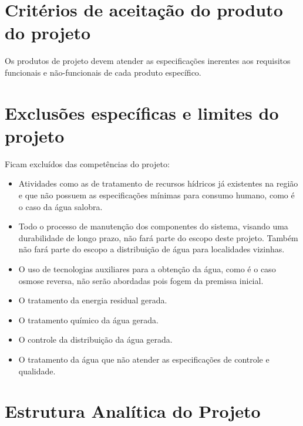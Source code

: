 \section*{Critérios de aceitação do produto do projeto}

  Os produtos de projeto devem atender as especificações inerentes aos requisitos funcionais
  e não-funcionais de cada produto específico.
  
\section*{Exclusões específicas e limites do projeto}

  Ficam excluídos das competências do projeto:
  
  \begin{itemize}
   \item Atividades como as de tratamento de recursos hídricos já existentes na região e que não possuem
      as especificações mínimas para consumo humano, como é o caso da água salobra.
   
   \item Todo o processo de manutenção dos componentes do sistema, visando uma durabilidade de longo prazo, não fará parte 
      do escopo deste projeto. Também não fará parte do escopo a distribuição de água para localidades vizinhas.
      
   \item O uso de tecnologias auxiliares para a obtenção da água, como é o caso osmose reversa, não serão abordadas
      pois fogem da premissa inicial.
   
   \item O tratamento da energia residual gerada.
   
   \item O tratamento químico da água gerada.
   
   \item O controle da distribuição da água gerada.
   
   \item O tratamento da água que não atender as especificações de controle e qualidade.
   
  \end{itemize}
  
\section*{Estrutura Analítica do Projeto}

